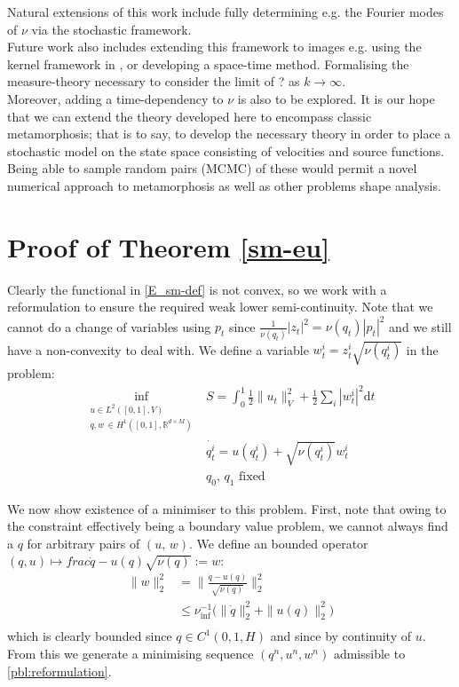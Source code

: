 \documentclass[runningheads]{llncs}
\newcommand{\half}{\frac 12}
\newcommand{\norm}[2]{\| #1 \|_{ #2 }}
\newcommand{\vnorm}[1]{\norm{ #1 }{V}}
\newcommand{\ltwonorm}[1]{\norm{ #1 }{2}}
\newcommand{\diff}[1]{\text{d} #1}
\newcommand{\RdM}{\mathbb{R}^{d\times M}}
\newcommand{\nuinf}{\nu_\text{inf}}
\begin{document}
Natural extensions of this work include fully determining e.g. the Fourier modes
of $\nu$ via the stochastic framework.\\

Future work also includes extending this framework to images e.g. using the
kernel framework in \cite{richardson2016metamorphosis}, or developing a
space-time method. Formalising the measure-theory necessary to consider the
limit of ? as $k\rightarrow\infty$.\\

Moreover, adding a time-dependency to $\nu$ is also to be explored. It is our
hope that we can extend the theory developed here to encompass classic
metamorphosis; that is to say, to develop the necessary theory in order to place
a stochastic model on the state space consisting of velocities and source
functions. Being able to sample random pairs (MCMC) of these would permit a
novel numerical approach to metamorphosis as well as other problems shape
analysis.

\appendix

\section{Proof of Theorem \ref{sm-eu}}\label{app:proof:sm-eu}
Clearly the functional in \eqref{E_sm-def} is not convex, so we work with a
reformulation to ensure the required weak lower semi-continuity. Note that
we cannot do a change of variables using $p_t$ since
$\frac{1}{\nu(q_t)}|z_t|^2 = \nu(q_t) |p_t|^2$ and we still have a
non-convexity to deal with. We define a variable $w^i_t = z^i_t
\sqrt{\nu(q_t^i)}$ in the problem:
\begin{align}
\inf_{\substack{u \in L^2([0,1],V)\\ q, w\, \in H^1([0,1],\RdM)}}
    & S = \int_0^1 \half\vnorm{u_t}^2 + \half\sum_i |w_t^i|^2 \diff{t}\\
    & \dot{q_t^i} = u(q_t^i) + \sqrt{\nu(q_t^i)} w^i_t\\
    & q_0,\,q_1\text{ fixed}
  \label{pbl:reformulation}
\end{align}

We now show existence of a minimiser to this problem. First, note that owing to
the constraint effectively being a boundary value problem, we cannot always find
a $q$ for arbitrary pairs of $(u,\,w)$. We define an bounded operator
$(q,u)\mapsto frac{\dot{q} - u(q)}{\sqrt{\nu(q)}} := w$:
\begin{align*}
\ltwonorm{w}^2 & = \ltwonorm{\frac{\dot{q} - u(q)}{\sqrt{\nu(q)}}}^2\\
& \leq \nuinf^{-1}\Big(\ltwonorm{\dot{q}}^2 + \ltwonorm{u(q)}^2\Big)\\
\end{align*}
which is clearly bounded since $q\in C^1(0,1,H)$ and since by continuity of $u$.
From this we generate a minimising sequence $(q^n, u^n, w^n)$ admissible to
\eqref{pbl:reformulation}.\\
\end{document}

